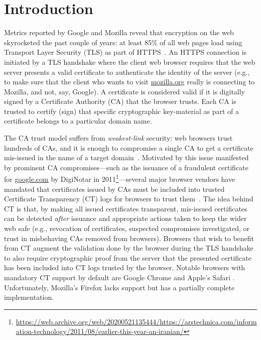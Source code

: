 \section{Introduction} \label{sec:introduction}
Metrics reported by Google and Mozilla reveal that encryption on the web
skyrocketed the past couple of years: at least 85\% of all web pages load using
Transport Layer Security (TLS) as part of
HTTPS~\cite{google-metrics,mozilla-metrics}. An HTTPS connection is initiated by
a TLS handshake where the client web browser requires that the web server
presents a valid certificate to authenticate the identity of the server (e.g.,
to make sure that the client who wants to visit \url{mozilla.org} really is
connecting to Mozilla, and not, say, Google). A certificate is considered valid
if it is digitally signed by a Certificate Authority (CA) that the browser
trusts. Each CA is trusted to certify (sign) that specific cryptographic
key-material as part of a certificate belongs to a particular domain name.

The CA trust model suffers from \emph{weakest-link} security: web browsers trust
hundreds of CAs, and it is enough to compromise a single CA to get a certificate
mis-issued in the name of a target domain~\cite{ca-ecosystem,https-sok}.
Motivated by this issue manifested by prominent CA compromises---such as the
issuance of a fraudulent certificate for \url{google.com} by DigiNotar in
2011\footnote{\url{https://web.archive.org/web/20200521135444/https://arstechnica.com/information-technology/2011/08/earlier-this-year-an-iranian/}}---several
major browser vendors have mandated that certificates issued by CAs must be
included into trusted Certificate Transparency (CT) logs for browsers to trust
them~\cite{ct/a,ct,ct/bis}. The idea behind CT is that, by making all issued
certificates transparent, mis-issued certificates can be detected \emph{after}
issuance and appropriate actions taken to keep the wider web safe (e.g.,
revocation of certificates, suspected compromises investigated, or trust in
misbehaving CAs removed from browsers). Browsers that wish to benefit from CT
augment the validation done by the browser during the TLS handshake to also
require cryptographic proof from the server that the presented certificate has
been included into CT logs trusted by the browser. Notable browsers with
mandatory CT support by default are Google Chrome and Apple's Safari
\cite{chrome-policy,safari-policy}. Unfortunately, Mozilla's Firefox lacks
support but has a partially complete implementation.

